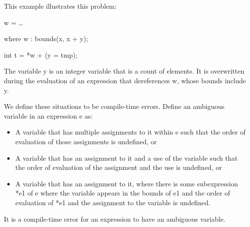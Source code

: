 \documentclass[]{article}
\begin{document}
This example illustrates this problem:

w = \ldots{}

where w : bounds(x, x + y);

int t = *w + (y = tmp);

The variable y is an integer variable that is a count of elements. It is
overwritten during the evaluation of an expression that dereferences w,
whose bounds include y.

We define these situations to be compile-time errors. Define an
ambiguous variable in an expression e as:

\begin{itemize}
\item
  A variable that has multiple assignments to it within e such that the
  order of evaluation of those assignments is undefined, or
\item
  A variable that has an assignment to it and a use of the variable such
  that the order of evaluation of the assignment and the use is
  undefined, or
\item
  A variable that has an assignment to it, where there is some
  subexpression *e1 of e where the variable appears in the bounds of e1
  and the order of evaluation of *e1 and the assignment to the variable
  is undefined.
\end{itemize}

It is a compile-time error for an expression to have an ambiguous
variable.
\end{document}
